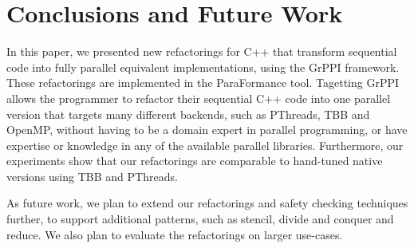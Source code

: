 





\section{Conclusions and Future Work}
In this paper, we presented new refactorings for C++ that transform sequential code into fully parallel equivalent implementations, using the GrPPI framework. These refactorings are implemented in the ParaFormance tool. Tagetting GrPPI allows the programmer to refactor their sequential C++ code into one parallel version that targets many different backends, such as PThreads, TBB and OpenMP, without having to be a domain expert in parallel programming, or have expertise or knowledge in any of the available parallel libraries.  Furthermore, our experiments show that our refactorings are comparable to hand-tuned native versions using TBB and PThreads.

As future work, we plan to extend our refactorings and safety checking techniques further, to support additional patterns, such as stencil, divide and conquer and reduce. We also plan to evaluate the refactorings on larger use-cases.









